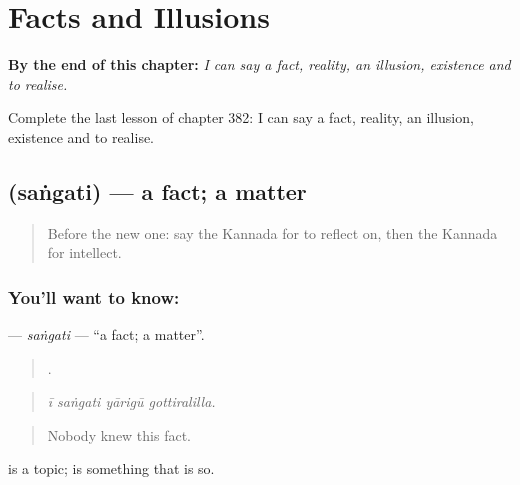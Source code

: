 
\chapter{Facts and Illusions}
\label{ch:ka-facts-and-illusions}

\begin{chapteropening}
\textbf{By the end of this chapter:} \emph{I can say a fact, reality, an illusion, existence and to realise.}

Complete the last lesson of chapter 382: I can say a fact, reality, an illusion, existence and to realise.
\end{chapteropening}

\section[\texorpdfstring{\kn{ಸಂಗತಿ} (saṅgati)}{ಸಂಗತಿ (saṅgati)}]{ (saṅgati) — a fact; a matter}

\label{lesson:KA-C382-sangati}



\begin{quote}
Before the new one: say the Kannada for to reflect on, then the Kannada for intellect.
\end{quote}

\subsection*{You'll want to know: }
\textbf{} — \emph{saṅgati} — \textquotedblleft{}a fact; a matter\textquotedblright{}.

\begin{quote}
   .
\end{quote}

\begin{quote}
\emph{ī saṅgati yārigū gottiralilla.}
\end{quote}

\begin{quote}
Nobody knew this fact.
\end{quote}

 is a topic;  is something that is so.

